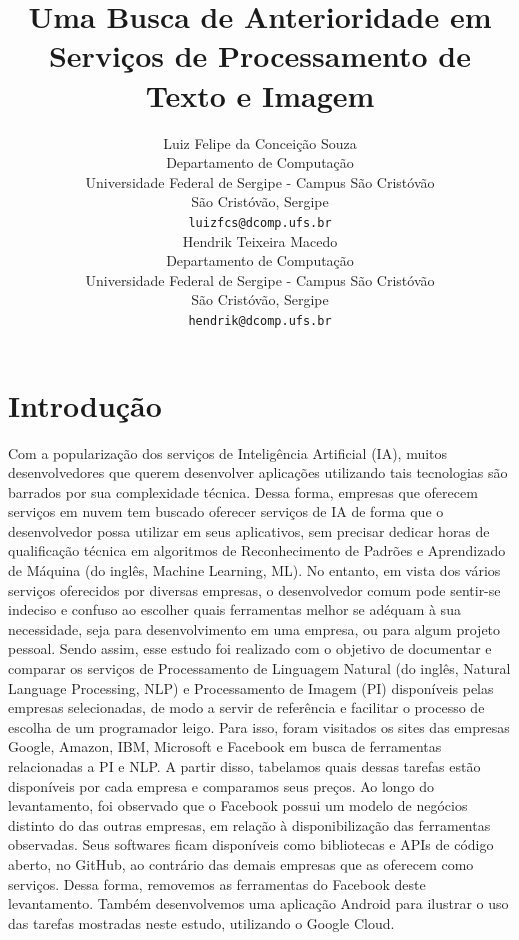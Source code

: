 \documentclass{article}
\title{Uma Busca de Anterioridade em Serviços de Processamento de Texto e Imagem}
\author{
  Luiz Felipe da Conceição Souza \\
  Departamento de Computação\\
  Universidade Federal de Sergipe - Campus São Cristóvão\\
  São Cristóvão, Sergipe \\
  \texttt{luizfcs@dcomp.ufs.br} \\
   \And
 Hendrik Teixeira Macedo \\
  Departamento de Computação\\
 Universidade Federal de Sergipe - Campus São Cristóvão\\
  São Cristóvão, Sergipe \\
  \texttt{hendrik@dcomp.ufs.br} \\
}
\begin{document}
\maketitle

\begin{abstract}
\lipsum[1]
\end{abstract}


\section{Introdução}
Com a popularização dos serviços de Inteligência Artificial (IA), muitos desenvolvedores que querem desenvolver aplicações utilizando tais tecnologias são barrados por sua complexidade técnica. Dessa forma, empresas que oferecem serviços em nuvem tem buscado oferecer serviços de IA de forma que o desenvolvedor possa utilizar em seus aplicativos, sem precisar dedicar horas de qualificação técnica em algoritmos de Reconhecimento de Padrões e Aprendizado de Máquina (do inglês, Machine Learning, ML). No entanto, em vista dos vários serviços oferecidos por diversas empresas, o desenvolvedor comum pode sentir-se indeciso e confuso ao escolher quais ferramentas melhor se adéquam à sua necessidade, seja para desenvolvimento em uma empresa, ou para algum projeto pessoal.
\newline
Sendo assim, esse estudo foi realizado com o objetivo de documentar e comparar os serviços de Processamento de Linguagem Natural (do inglês, Natural Language Processing, NLP) e Processamento de Imagem (PI) disponíveis pelas empresas selecionadas, de modo a servir de referência e facilitar o processo de escolha de um programador leigo. Para isso, foram visitados os sites das empresas Google, Amazon, IBM, Microsoft e Facebook em busca de ferramentas relacionadas a PI e NLP. A partir disso, tabelamos quais dessas tarefas estão disponíveis por cada empresa e comparamos seus preços. Ao longo do levantamento, foi observado que o Facebook possui um modelo de negócios distinto do das outras empresas, em relação à disponibilização das ferramentas observadas. Seus softwares ficam disponíveis como bibliotecas e APIs de código aberto, no GitHub, ao contrário das demais empresas que as oferecem como serviços. Dessa forma, removemos as ferramentas do Facebook deste levantamento. Também desenvolvemos uma aplicação Android para ilustrar o uso das tarefas mostradas neste estudo, utilizando o Google Cloud.
\end{document}
